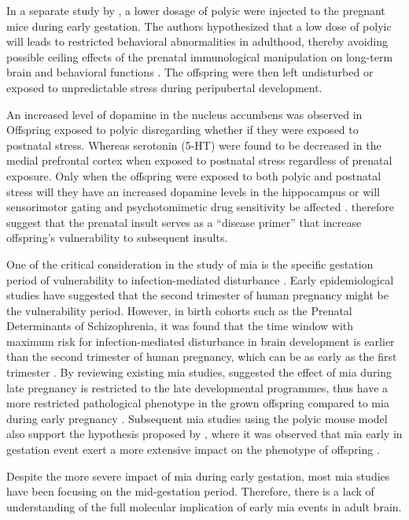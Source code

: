 \documentclass[12pt]{scrbook}
\newcommand*{\Scz}{Schizophrenia}
\begin{document}
In a separate study by \citet{Giovanoli2013}, a lower dosage of \gls{polyic} were injected to the pregnant mice during early gestation.
The authors hypothesized that a low dose of \gls{polyic} will leads to restricted behavioral abnormalities in adulthood, thereby avoiding possible ceiling effects of the prenatal immunological manipulation on long-term brain and behavioral functions \citep{Giovanoli2013}. 
The offspring were then left undisturbed or exposed to unpredictable stress during peripubertal development.

An increased level of dopamine in the nucleus accumbens was observed in Offspring exposed to \gls{polyic} disregarding whether if they were exposed to postnatal stress.
Whereas serotonin (5-HT) were found to be decreased in the medial prefrontal cortex when exposed to postnatal stress regardless of prenatal exposure.
Only when the offspring were exposed to both \gls{polyic} and postnatal stress will they have an increased dopamine levels in the hippocampus or will sensorimotor gating and psychotomimetic drug sensitivity be affected \citep{Giovanoli2013}.
\citet{Giovanoli2013} therefore suggest that the prenatal insult serves as a ``disease primer'' that increase offspring's vulnerability to subsequent insults.

One of the critical consideration in the study of \gls{mia} is the specific gestation period of vulnerability to infection-mediated disturbance \citep{Meyer2007a}.
Early epidemiological studies have suggested that the second trimester of human pregnancy might be the vulnerability period.
However, in birth cohorts such as the Prenatal Determinants of \Scz, it was found that the time window with maximum risk for infection-mediated disturbance in brain development is earlier than the second trimester of human pregnancy, which can be as early as the first trimester \citep{Meyer2007a}.
By reviewing existing \gls{mia} studies, \citet{Meyer2007a} suggested the effect of \gls{mia} during late pregnancy is restricted to the late developmental programmes, thus have a more restricted pathological phenotype in the grown offspring compared to \gls{mia} during early pregnancy \citep{Meyer2007a}.
Subsequent \gls{mia} studies using the \gls{polyic} mouse model also support the hypothesis proposed by \citet{Meyer2007a}, where it was observed that \gls{mia} early in gestation event exert a more extensive impact on the phenotype of offspring \citep{Li2009c,Li2010a}.
	
Despite the more severe impact of \gls{mia} during early gestation, most \gls{mia} studies have been focusing on the mid-gestation period.
Therefore, there is a lack of understanding of the full molecular implication of early \gls{mia} events in adult brain.
\end{document}
